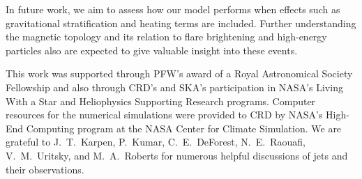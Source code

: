 \documentclass[twocolumn]{aastex6}
\begin{document}
In future work, we aim to assess how our model performs when effects such as gravitational stratification and heating terms are included. Further understanding the magnetic topology and its relation to flare brightening and high-energy particles also are expected to give valuable insight into these events. 

\acknowledgments
This work was supported through PFW's award of a Royal Astronomical Society Fellowship and also through CRD's and SKA's participation in NASA's Living With a Star and Heliophysics Supporting Research programs. Computer resources for the numerical simulations were provided to CRD by NASA's High-End Computing program at the NASA Center for Climate Simulation. We are grateful to J.\ T.\ Karpen, {P.\ Kumar, C.\ E.\ DeForest, N.\ E.\ Raouafi, V.\ M.\ Uritsky, and M.\ A.\ Roberts} for numerous helpful discussions of jets and their observations.


%
%
\end{document}
